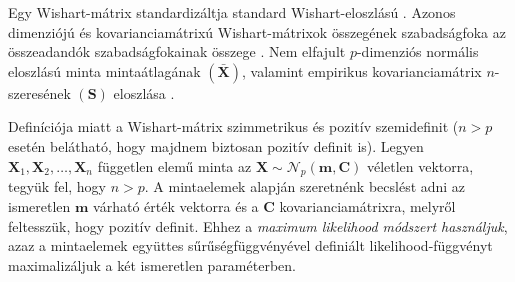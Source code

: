 \documentclass[DIV=15,appendixprefix]{scrreprt}
\theoremstyle{definition}
\theoremstyle{remark}
\newcommand{\normald}{\mathcal{N}}
\begin{document}
Egy Wishart-mátrix standardizáltja standard Wishart-eloszlású \cite[5. fejezet, 4. szakasz, 4.1.
tétel]{BollaKramli}. Azonos dimenziójú és kovarianciamátrixú Wishart-mátrixok összegének
szabadságfoka az összeadandók szabadságfokainak összege \cite[5. fejezet, 4. szakasz, 4.2.
állítás]{BollaKramli}. Nem elfajult $ p $-dimenziós normális eloszlású minta mintaátlagának $ \left(
\bar{ \mathbf{ X } } \right) $, valamint empirikus kovarianciamátrix $ n $-szeresének $ \left(
\mathbf{ S } \right) $ eloszlása \cite[5. fejezet, 4. szakasz, 4.3. tétel]{BollaKramli}.

Definíciója miatt a Wishart-mátrix szimmetrikus és pozitív szemidefinit ($ n > p $ esetén belátható,
hogy majdnem biztosan pozitív definit is).
%
Legyen $ \mathbf{ X }_{ 1 },{} \mathbf{ X }_{ 2 },{} \ldots,{} \mathbf{ X }_{ n } $ független elemű
minta az $ \mathbf{ X } \sim \normald_{ p } \left( \mathbf{ m },{} \mathbf{ C } \right) $ véletlen
vektorra, tegyük fel, hogy $ n > p $. A mintaelemek alapján szeretnénk becslést adni az ismeretlen
$ \mathbf{ m } $ várható érték vektorra és a $ \mathbf{ C } $ kovarianciamátrixra, melyről
feltesszük, hogy pozitív definit. Ehhez a \emph{maximum likelihood módszert használjuk}, azaz a
mintaelemek együttes sűrűségfüggvényével definiált likelihood-függvényt maximalizáljuk a két
ismeretlen paraméterben.
\end{document}
